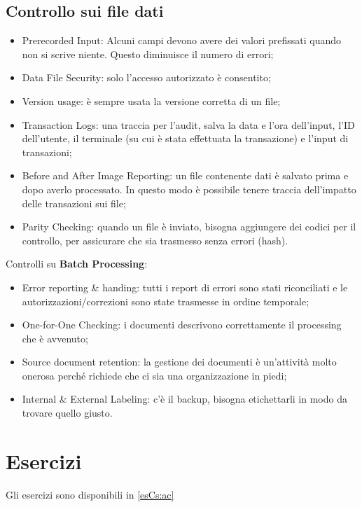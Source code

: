 \subsection{Controllo sui file dati}
\begin{itemize}
\item Prerecorded Input: Alcuni campi devono avere dei valori prefissati
quando non si scrive niente. Questo diminuisce il numero di errori;

\item Data File Security: solo l'accesso autorizzato è consentito;
\item Version usage: è sempre usata la versione corretta di un file;
\item Transaction Logs: una traccia per l'audit, salva la data e l'ora
dell'input, l'ID dell'utente, il terminale (su cui è stata effettuata la
transazione) e l'input di transazioni;
\item Before and After Image Reporting: un file contenente dati è salvato
prima e dopo averlo processato. In questo modo è possibile tenere traccia
dell'impatto delle transazioni sui file;
\item Parity Checking: quando un file è inviato, bisogna aggiungere dei codici
per il controllo, per assicurare che sia trasmesso senza errori (hash).
\end{itemize}

Controlli su \textbf{Batch Processing}:
\begin{itemize}
\item
Error reporting \& handing: tutti i report di errori sono stati riconciliati
e le autorizzazioni/correzioni sono state trasmesse in ordine temporale;
\item
One-for-One Checking: i documenti descrivono correttamente il processing
che è avvenuto;
\item
Source document retention: la gestione dei documenti è un'attività molto
onerosa perché richiede che ci sia una organizzazione in piedi;
\item
Internal \& External Labeling: c'è il backup, bisogna etichettarli in
modo da trovare quello giusto.
\end{itemize}





\section{Esercizi}

Gli esercizi sono disponibili in \ref{esCs:ac}

